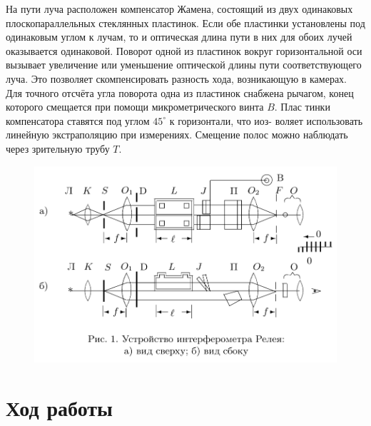 \documentclass[a4paper,12pt]{article}
\theoremstyle{definition}
\begin{document}
\par На пути луча расположен компенсатор Жамена, состоящий из двух
одинаковых плоскопараллельных стеклянных пластинок. Если обе
пластинки установлены под одинаковым углом к лучам, то и оптическая длина
пути в них для обоих лучей оказывается одинаковой. Поворот одной из пластинок
вокруг горизонтальной оси вызывает увеличение или уменьшение оптической длины
пути соответствующего луча. Это позволяет скомпенсировать разность хода,
возникающую в камерах. Для точного отсчёта угла поворота одна из пластинок
снабжена рычагом, конец которого смещается при помощи микрометрического
винта $B$. Плас тинки компенсатора ставятся под углом $45^{\circ}$ к горизонтали, что иоз-
воляет использовать линейную экстраполяцию при измерениях. Смещение полос
можно наблюдать через зрительную трубу $T$.

\begin{figure}[H]
    \centering
    \includegraphics[width=19cm]{pic1.png}
\end{figure}

\section{Ход работы}
\end{document}
